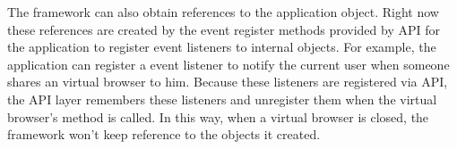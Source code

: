 \apireferencefig{}


The framework can also obtain references to the application object.  Right now
these references are created by the event register methods provided by API for
the application to register event listeners to internal objects. For example,
the application can register a event listener to notify the current user when
someone shares an virtual browser to him. Because these listeners are
registered via API, the API layer remembers these listeners and unregister
them when the virtual browser's  method is called. In this way,
when a virtual browser is closed, the framework won't keep reference to the
objects it created.
